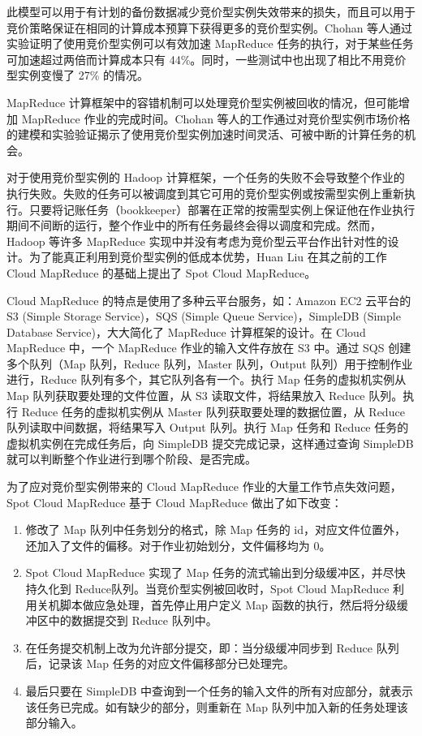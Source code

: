 此模型可以用于有计划的备份数据减少竞价型实例失效带来的损失，而且可以用于竞价策略保证在相同的计算成本预算下获得更多的竞价型实例。Chohan 等人通过实验证明了使用竞价型实例可以有效加速 MapReduce 任务的执行，对于某些任务可加速超过两倍而计算成本只有 44\%。同时，一些测试中也出现了相比不用竞价型实例变慢了 27\% 的情况。

MapReduce 计算框架中的容错机制可以处理竞价型实例被回收的情况，但可能增加 MapReduce 作业的完成时间。Chohan 等人的工作通过对竞价型实例市场价格的建模和实验验证揭示了使用竞价型实例加速时间灵活、可被中断的计算任务的机会。

对于使用竞价型实例的 Hadoop \cite{hadoop:2014} 计算框架，一个任务的失败不会导致整个作业的执行失败。失败的任务可以被调度到其它可用的竞价型实例或按需型实例上重新执行。只要将记账任务（bookkeeper）部署在正常的按需型实例上保证他在作业执行期间不间断的运行，整个作业中的所有任务最终会得以调度和完成。然而，Hadoop 等许多 MapReduce 实现中并没有考虑为竞价型云平台作出针对性的设计。为了能真正利用到竞价型实例的低成本优势，Huan Liu \cite{Liu:2011:CMC:2170444.2170450} 在其之前的工作 Cloud MapReduce \cite{Liu:2011:CMM:2007336.2007355} 的基础上提出了 Spot Cloud MapReduce。

Cloud MapReduce 的特点是使用了多种云平台服务，如：Amazon EC2 云平台的 S3 (Simple Storage Service)，SQS (Simple Queue Service)，SimpleDB (Simple Database Service)，大大简化了 MapReduce 计算框架的设计。在 Cloud MapReduce 中，一个 MapReduce 作业的输入文件存放在 S3 中。通过 SQS 创建多个队列（Map 队列，Reduce 队列，Master 队列，Output 队列）用于控制作业进行，Reduce 队列有多个，其它队列各有一个。执行 Map 任务的虚拟机实例从 Map 队列获取要处理的文件位置，从 S3 读取文件，将结果放入 Reduce 队列。执行 Reduce 任务的虚拟机实例从 Master 队列获取要处理的数据位置，从 Reduce 队列读取中间数据，将结果写入 Output 队列。执行 Map 任务和 Reduce 任务的虚拟机实例在完成任务后，向 SimpleDB 提交完成记录，这样通过查询 SimpleDB 就可以判断整个作业进行到哪个阶段、是否完成。

为了应对竞价型实例带来的 Cloud MapReduce 作业的大量工作节点失效问题，Spot Cloud MapReduce 基于 Cloud MapReduce 做出了如下改变：
\begin{enumerate}
\item 修改了 Map 队列中任务划分的格式，除 Map 任务的 id，对应文件位置外，还加入了文件的偏移。对于作业初始划分，文件偏移均为 0。
\item Spot Cloud MapReduce 实现了 Map 任务的流式输出到分级缓冲区，并尽快持久化到 Reduce队列。当竞价型实例被回收时，Spot Cloud MapReduce 利用关机脚本做应急处理，首先停止用户定义 Map 函数的执行，然后将分级缓冲区中的数据提交到 Reduce 队列中。
\item 在任务提交机制上改为允许部分提交，即：当分级缓冲同步到 Reduce 队列后，记录该 Map 任务的对应文件偏移部分已处理完。
\item 最后只要在 SimpleDB 中查询到一个任务的输入文件的所有对应部分，就表示该任务已完成。如有缺少的部分，则重新在 Map 队列中加入新的任务处理该部分输入。
\end{enumerate}

